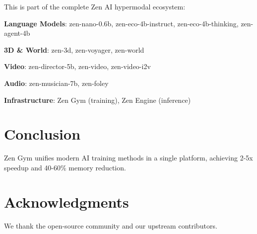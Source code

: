 \documentclass[11pt,a4paper]{article}
\begin{document}
This is part of the complete Zen AI hypermodal ecosystem:

\textbf{Language Models}: zen-nano-0.6b, zen-eco-4b-instruct, zen-eco-4b-thinking, zen-agent-4b

\textbf{3D \& World}: zen-3d, zen-voyager, zen-world

\textbf{Video}: zen-director-5b, zen-video, zen-video-i2v

\textbf{Audio}: zen-musician-7b, zen-foley

\textbf{Infrastructure}: Zen Gym (training), Zen Engine (inference)

\section{Conclusion}
Zen Gym unifies modern AI training methods in a single platform, achieving 2-5x speedup and 40-60\% memory reduction.

\section*{Acknowledgments}
We thank the open-source community and our upstream contributors.



\end{document}
